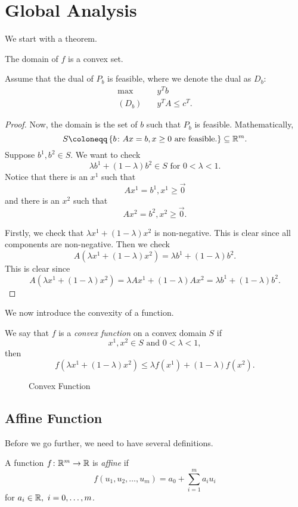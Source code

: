 \section{Global Analysis}
We start with a theorem.
\begin{theorem}
	The domain of \(f\) is a convex set.
\end{theorem}
Assume that the dual of \(P_b\) is feasible, where we denote the dual as \(D_b\):
\begin{align*}
	\max~      & y^{T}b            \\
	(D_b)\quad & y^{T}A\leq c^{T}.
\end{align*}

\begin{proof}
	Now, the domain is the set of \(b\) such that \(P_b\) is feasible. Mathematically,
	\[
		S\coloneqq \left\{ b\colon Ax = b, x\geq 0 \text{ are feasible.}\right\}\subseteq \mathbb{\MakeUppercase{R}}^m.
	\]
	Suppose \(b^1, b^2\in S\). We want to check
	\[
		\lambda b^{1}+(1-\lambda) b^2 \in S\text{ for }0<\lambda<1.
	\]
	Notice that there is an \(x^1\) such that
	\[
		Ax^1 = b^1, x^1\geq \vec{0}
	\]
	and there is an \(x^2\) such that
	\[
		Ax^2 = b^2, x^2\geq \vec{0}.
	\]

	Firstly, we check that \(\lambda x^{1}+(1 - \lambda)x^2\) is non-negative. This is clear since all components are non-negative. Then we check
	\[
		A(\lambda x^{1}+(1 - \lambda)x^2) = \lambda b^1 + (1 - \lambda)b^2.
	\]
	This is clear since
	\[
		A(\lambda x^{1}+(1 - \lambda)x^2) = \lambda Ax^1 + (1 - \lambda)Ax^2 = \lambda b^1 + (1-\lambda)b^2.
	\]
\end{proof}

We now introduce the convexity of a function.
\begin{definition}
	We say that \(f\) is a \emph{convex function} on a convex domain \(S\) if
	\[
		x^1, x^2\in S\text{ and }0<\lambda<1,
	\]
	then
	\[
		f(\lambda x^1+(1 - \lambda)x^2)\leq \lambda f(x^1)+(1-\lambda)f(x^2).
	\]
\end{definition}

\begin{figure}[H]
	\centering
	\caption{Convex Function}
	\label{fig:convex-function}
\end{figure}

\subsection{Affine Function}
Before we go further, we need to have several definitions.
\begin{definition}
	A function \(f\colon \mathbb{\MakeUppercase{R}}^{m}\to \mathbb{\MakeUppercase{R}}\) is \emph{affine} if
	\[
		f(u_1, u_2, \ldots , u_m) = a_0 + \sum\limits_{i=1}^{m} a_{i}u_{i}
	\]
	for \(a_i \in\mathbb{\MakeUppercase{R}},\ i = 0, \ldots , m\).
\end{definition}

